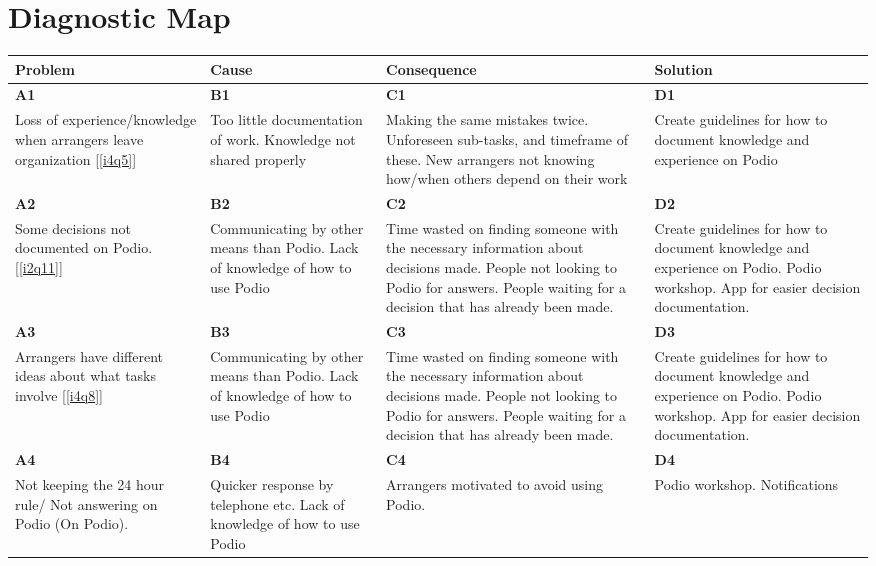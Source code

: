 \section{Diagnostic Map} %
\label{diagnostic_map}

\begin{tabular}{| p{3.5 cm} | p{3.5 cm} | p{3.5 cm} | p{3.5 cm} |}
  \hline                        
  \textbf{Problem} & \textbf{Cause} & \textbf{Consequence} & \textbf{Solution} \\ \hline
  \textbf{A1} & \textbf{B1} & \textbf{C1} & \textbf{D1} \\ 
  Loss of experience/knowledge when arrangers leave organization [\ref{i4q5}]
  & Too little documentation of work. Knowledge not shared properly 
  & Making the same mistakes twice. Unforeseen sub-tasks, and timeframe of these. New arrangers not knowing how/when others depend on their work
  &	Create guidelines for how to document knowledge and experience on Podio \\
  \hline
  \textbf{A2} & \textbf{B2} & \textbf{C2} & \textbf{D2} \\ 
  Some decisions not documented on Podio. [\ref{i2q11}]
  & Communicating by other means than Podio. Lack of knowledge of how to use Podio
  & Time wasted on finding someone with the necessary information about decisions made. People not looking to Podio for answers. People waiting for a decision that has already been made.
  & Create guidelines for how to document knowledge and experience on Podio. Podio workshop. App for easier decision documentation. \\
  \hline
  \textbf{A3} & \textbf{B3} & \textbf{C3} & \textbf{D3} \\ 
   Arrangers have different ideas about what tasks involve [\ref{i4q8}]
  & Communicating by other means than Podio. Lack of knowledge of how to use Podio
  & Time wasted on finding someone with the necessary information about decisions made. People not looking to Podio for answers. People waiting for a decision that has already been made.
  & Create guidelines for how to document knowledge and experience on Podio. Podio workshop. App for easier decision documentation. \\
  \hline
  \textbf{A4} & \textbf{B4} & \textbf{C4} & \textbf{D4} \\ 
  Not keeping the 24 hour rule/ Not answering on Podio (On Podio).
  & Quicker response by telephone etc. Lack of knowledge of how to use Podio
  & Arrangers motivated to avoid using Podio.
  & Podio workshop. Notifications \\

\end{tabular}

